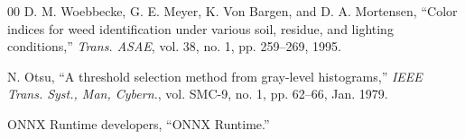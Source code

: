 \documentclass{ieeeaccess}
\begin{document}
\begin{thebibliography}{00}
D. M. Woebbecke, G. E. Meyer, K. Von Bargen, and D. A. Mortensen,
``Color indices for weed identification under various soil, residue, and lighting conditions,''
\emph{Trans. ASAE}, vol. 38, no. 1, pp. 259--269, 1995.

N. Otsu,
``A threshold selection method from gray-level histograms,''
\emph{IEEE Trans. Syst., Man, Cybern.}, vol. SMC-9, no. 1, pp. 62--66,
Jan. 1979.

ONNX Runtime developers,
``ONNX Runtime.''

\end{thebibliography}

\EOD
\end{document}
